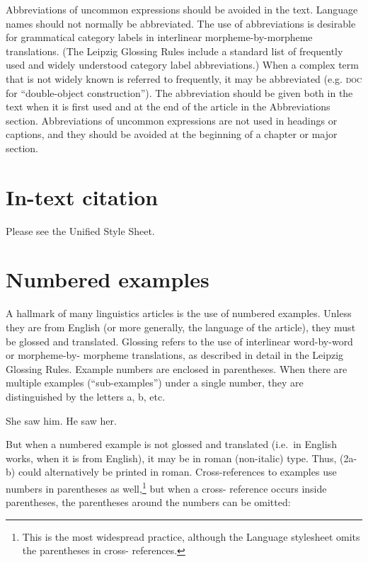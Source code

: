 \documentclass[a4paper]{article}
\newcommand{\gsrex}[1]{{\color{blue}#1}}
\newcommand{\eagsr}{\bgroup\color{blue}\ea}
\newcommand{\zgsr}{\z\egroup}
\begin{document}
Abbreviations of uncommon expressions should be avoided in the text.
Language names should not normally be abbreviated. The use of
abbreviations is desirable for grammatical category labels in
interlinear morpheme-by-morpheme translations. (The Leipzig Glossing
Rules include a standard list of frequently used and widely understood
category label abbreviations.) When a complex term that is not widely
known is referred to frequently, it may be abbreviated (e.g. \gsrex{\textsc{doc}} for
``double-object construction''). The abbreviation should be given both
in the text when it is first used and at the end of the article in the
Abbreviations section. Abbreviations of uncommon expressions are not
used in headings or captions, and they should be avoided at the
beginning of a chapter or major section.

\section{In-text citation}\label{sec:in-text-citation}

Please see the Unified Style Sheet.

\section{Numbered examples}\label{sec:numbered-examples}

A hallmark of many linguistics articles is the use of numbered examples.
Unless they are from English (or more generally, the language of the
article), they must be glossed and translated. Glossing refers to the
use of interlinear word-by-word or morpheme-by- morpheme translations,
as described in detail in the Leipzig Glossing Rules. Example numbers
are enclosed in parentheses. When there are multiple examples
(``sub-examples'') under a single number, they are distinguished by the
letters a, b, etc.

\eagsr
  \eagsr She saw him. 
  \ex He saw her.
  \zgsr
\zgsr

But when a numbered example is not glossed and translated (i.e.~in
English works, when it is from English), it may be in roman (non-italic)
type. Thus, (2a-b) could alternatively be printed in roman.
Cross-references to examples use numbers in parentheses as well,\footnote{
This is the most widespread practice, although the Language stylesheet
omits the parentheses in cross- references.} but when a cross-
reference occurs inside parentheses, the parentheses around the numbers
can be omitted:
\end{document}
